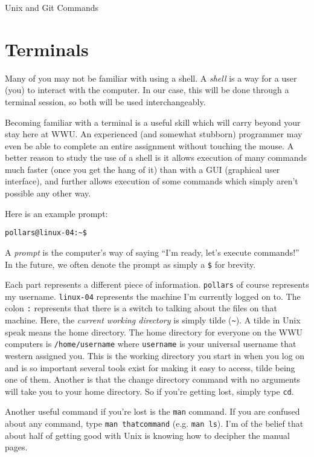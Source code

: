 \documentclass[12pt]{article}
\begin{document}
\begin{center}
	{\Large Unix and Git Commands}
\end{center}
\section{Terminals}

Many of you may not be familiar with using a shell. A \emph{shell} is a way for a user (you) to interact with the computer. In our case, this will be done through a terminal session, so both will be used interchangeably.

Becoming familiar with a terminal is a useful skill which will carry beyond your stay here at WWU. An experienced (and somewhat stubborn) programmer may even be able to complete an entire assignment without touching the mouse. A better reason to study the use of a shell is it allows execution of many commands much faster (once you get the hang of it) than with a GUI (graphical user interface), and further allows execution of some commands which simply aren't possible any other way.

Here is an example prompt:
\begin{verbatim}
pollars@linux-04:~$
\end{verbatim}
A \emph{prompt} is the computer's way of saying ``I'm ready, let's execute commands!'' In the future, we often denote the prompt as simply a \verb|$| for brevity.

Each part represents a different piece of information. \verb|pollars| of course represents my username. \verb|linux-04| represents the machine I'm currently logged on to. The colon \verb|:| represents that there is a switch to talking about the files on that machine. Here, the \emph{current working directory} is simply tilde (\verb|~|). A tilde in Unix speak means the home directory. The home directory for everyone on the WWU computers is \verb|/home/username| where \verb|username| is your universal username that western assigned you. This is the working directory you start in when you log on and is so important several tools exist for making it easy to access, tilde being one of them. Another is that the change directory command with no arguments will take you to your home directory. So if you're getting lost, simply type \verb|cd|.

Another useful command if you're lost is the \verb|man| command. If you are confused about any command, type \verb|man thatcommand| (e.g. \verb|man ls|). I'm of the belief that about half of getting good with Unix is knowing how to decipher the manual pages.
\end{document}
